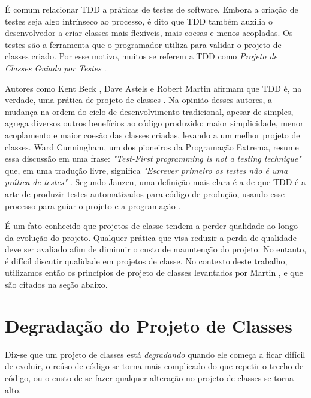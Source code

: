 \documentclass[conference]{IEEEtran}
\begin{document}
É comum relacionar TDD a práticas de testes de software. 
Embora a criação de testes seja algo intrínseco ao processo, é dito que TDD também 
auxilia o desenvolvedor a criar classes mais flexíveis, mais coesas e
menos acopladas. Os testes são a ferramenta que o programador utiliza para
validar o projeto de classes criado. Por esse motivo, muitos se referem a TDD como
\textit{Projeto de Classes Guiado por Testes} \cite{tdd-taxonomy}.

Autores como Kent Beck \cite{aim-fire}, Dave Astels \cite{astels-tdd} e
Robert Martin \cite{bob-martin} afirmam que TDD é, na verdade, uma prática de
projeto de classes \cite{tdd-taxonomy} \cite{aim-fire}.
Na opinião desses autores, a mudança na ordem do ciclo de
desenvolvimento tradicional, apesar de simples, agrega diversos outros
benefícios ao código produzido: maior simplicidade, menor acoplamento e maior
coesão das classes criadas, levando a um melhor projeto de classes. 
Ward Cunningham, um dos pioneiros da Programação Extrema, resume essa 
discussão em uma frase: \textit{"Test-First programming is not a testing technique"} 
que, em uma tradução livre, significa \textit{"Escrever primeiro os testes
não é uma prática de testes"} \cite{aim-fire}.
Segundo Janzen, uma definição mais clara é a de que TDD é a arte de produzir testes
automatizados para código de produção, usando esse processo para guiar o 
projeto e a programação \cite{agilealliance-tdd} \cite{tdd-taxonomy}.

É um fato conhecido que projetos de classe tendem a perder qualidade ao longo da evolução
do projeto. Qualquer prática que visa reduzir a perda de qualidade deve ser avaliado afim
de diminuir o custo de manutenção do projeto. No entanto, é difícil discutir qualidade
em projetos de classe. No contexto deste trabalho, utilizamos então os princípios de projeto
de classes levantados por Martin \cite{bob-martin}, e que são citados na seção abaixo.

\section{Degradação do Projeto de Classes}

Diz-se que um projeto de classes está \textit{degradando}
quando ele começa a ficar difícil de evoluir, o reúso de código se 
torna mais complicado do que repetir o trecho de código, ou o custo de se fazer 
qualquer alteração no projeto de classes se torna alto.
\end{document}
